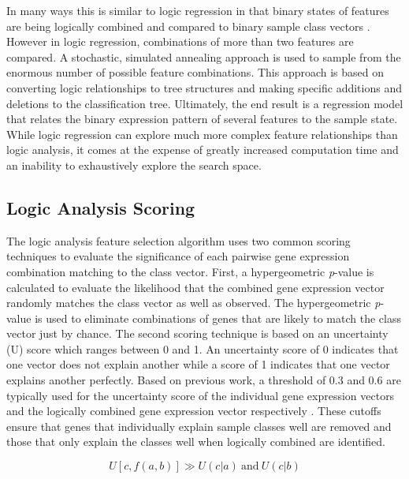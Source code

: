 {In many ways this is similar to logic regression in that binary states of
features are being logically combined and compared to binary sample class
vectors \cite{ruczinski2004eih}.  However in logic regression, combinations of more
than two features are compared.  A stochastic, simulated annealing approach is
used to sample from the enormous number of possible feature combinations.  This
approach is based on converting logic relationships to tree structures and
making specific additions and deletions to the classification tree.
Ultimately, the end result is a regression model that relates the binary
expression pattern of several features to the sample state.  While logic
regression can explore much more complex feature relationships than logic
analysis, it comes at the expense of greatly increased computation time and an
inability to exhaustively explore the search space.

\subsection{Logic Analysis Scoring}

The logic analysis feature selection algorithm uses two common scoring
techniques to evaluate the significance of each pairwise gene expression combination
matching to the class vector.  First, a hypergeometric \emph{p}-value is 
calculated to evaluate the likelihood that the combined gene expression vector randomly
matches the class vector as well as observed.  The hypergeometric
\emph{p}-value is used to eliminate combinations of genes that are likely to
match the class vector just by chance. The second scoring technique is based on
an uncertainty (U) score which ranges between 0 and 1. An uncertainty score of
0 indicates that one vector does not explain another while a score of 1
indicates that one vector explains another perfectly.  Based on previous work, a
threshold of 0.3 and 0.6 are typically used for the uncertainty score of the
individual gene expression vectors and the logically combined gene expression
vector respectively \cite{PMID_170746732}.  These cutoffs ensure that genes that
individually explain sample classes well are removed and those that only
explain the classes well when logically combined are identified.

\begin{equation}\label{laeq1}
U \left[ c,  f \left( a, b \right)  \right]  \gg U \left( c | a \right) \ \mathrm{ and } \ U \left( c | b \right)
\end{equation}

}
